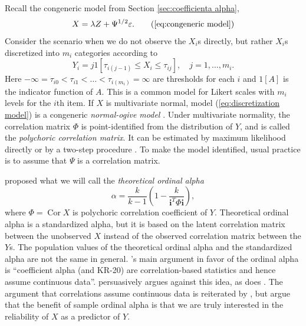 \documentclass[twoside]{article}
\DeclareMathOperator{\Cor}{Cor}
\begin{document}
Recall the congeneric model from Section \ref{sec:coefficienta alpha},
\begin{equation}
X=\lambda Z+\Psi^{1/2}\varepsilon.    \tag{\ref{eq:congeneric model}}
\end{equation}
Consider the scenario when we do not observe the $X_{i}$s directly,
but rather $X_{i}$s discretized into $m_{i}$ categories according
to
\begin{equation}
Y_{i}=j1[\tau_{i(j-1)}\leq X_{i}\leq\tau_{ij}],\quad j = 1, \ldots,m_i. \label{eq:discretization model}
\end{equation}
Here $-\infty=\tau_{i0}<\tau_{i1}<\ldots<\tau_{i(m_{i})}=\infty$
are thresholds for each $i$ and $1[A]$ is the indicator function of $A$.
This is a common model for Likert scales with $m_{i}$ levels for
the $i$th item. If $X$ is multivariate normal, model (\ref{eq:discretization model})
is a congeneric \textit{normal-ogive model} \citep{Swaminathan2016-rg}.
Under multivariate normality, the correlation matrix $\Phi$ is point-identified
from the distribution of $Y$, and is called the \textit{polychoric
correlation matrix}. It can be estimated by maximum likelihood directly
or by a two-step procedure \citep{Olsson1979-ti}. To make the model
identified, usual practice is to assume that $\Psi$ is a correlation matrix.

\citet{Zumbo2007-ap} proposed what we will call the \textit{theoretical ordinal
alpha}
\begin{equation}
\alpha=\frac{k}{k-1}\left(1-\frac{k}{\mathbf{i}^{T}\Phi\mathbf{i}}\right), \label{eq:ordinal alpha}
\end{equation}
where $\Phi=\Cor X$ is polychoric correlation coefficient of $Y$.
Theoretical ordinal alpha is a standardized alpha, but it is based
on the latent correlation matrix between the unobserved $X$ instead
of the observed correlation matrix between the $Y$s. The population
values of the theoretical ordinal alpha and the standardized alpha
are not the same in general. \citet[p. 27]{Zumbo2007-ap}'s main argument
in favor of the ordinal alpha is \enquote{coefficient alpha (and KR-20)
are correlation-based statistics and hence assume continuous data}. \citet[p. 1060]{Chalmers2018-fj}
persuasively argues against this idea, as does \citet{Raykov2019-yr}. The argument that correlations assume continuous data is reiterated
by \citet{Gadermann2012-jl}, but \citet{Zumbo2019-lm} argue
that the benefit of sample ordinal alpha is that we are truly interested
in the reliability of $X$ as a predictor of $Y$.
 
\end{document}
